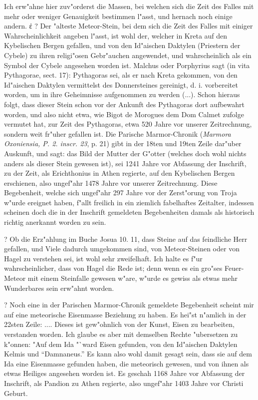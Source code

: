 \documentclass[a4paper, 11pt, oneside, polutonikogreek, german]{article}
\begin{document}
Ich erw"ahne hier zuv"orderst die Massen, bei welchen sich die Zeit des Falles mit mehr oder weniger Genauigkeit bestimmen l"asst, und hernach noch einige andern.
ἐ
? Der "alteste Meteor-Stein, bei dem sich die Zeit des Falles mit einiger Wahrscheinlichkeit angeben l"asst, ist wohl der, welcher in Kreta auf den Kybelischen Bergen gefallen, und von den Id"aischen Daktylen (Priestern der Cybele) zu ihren religi"osen Gebr"auchen angewendet, und wahrscheinlich als ein Symbol der Cybele angesehen worden ist. Malchus oder Porphyrius sagt (in vita Pythagorae, sect. 17): Pythagoras sei, als er nach Kreta gekommen, von den Id"aischen Daktylen vermittelst des Donnersteines gereinigt, d. i. vorbereitet worden, um in ihre Geheimnisse aufgenommen zu werden (...). Schon hieraus folgt, dass dieser Stein schon vor der Ankunft des Pythagoras dort aufbewahrt worden, und also nicht etwa, wie Bigot de Morogues dem Dom Calmet zufolge vermutet hat, zur Zeit des Pythagoras, etwa 520 Jahre vor unserer Zeitrechnung, sondern weit fr"uher gefallen ist. Die Parische Marmor-Chronik (\emph{Marmora Oxoniensia, P. 2. inscr. 23}, p. 21) gibt in der 18ten und 19ten Zeile dar"uber Auskunft, und sagt: das Bild der Mutter der G"otter (welches doch wohl nichts anders als dieser Stein gewesen ist), sei 1241 Jahre vor Abfassung der Inschrift, zu der Zeit, als Erichthonius in Athen regierte, auf den Kybelischen Bergen erschienen, also ungef"ahr 1478 Jahre vor unserer Zeitrechnung. Diese Begebenheit, welche sich ungef"ahr 297 Jahre vor der Zerst"orung von Troja w"urde ereignet haben, f"allt freilich in ein ziemlich fabelhaftes Zeitalter, indessen scheinen doch die in der Inschrift gemeldeten Begebenheiten damals als historisch richtig anerkannt worden zu sein.

? Ob die Erz"ahlung im Buche Josua 10. 11, dass Steine auf das feindliche Herr gefallen, und Viele dadurch umgekommen sind, von Meteor-Steinen oder von Hagel zu verstehen sei, ist wohl sehr zweifelhaft. Ich halte es f"ur wahrscheinlicher, dass von Hagel die Rede ist; denn wenn es ein gro"ses Feuer-Meteor mit einem Steinfalle gewesen w"are, w"urde es gewiss als etwas mehr Wunderbares sein erw"ahnt worden.

? Noch eine in der Parischen Marmor-Chronik gemeldete Begebenheit scheint mir auf eine meteorische Eisenmasse Beziehung zu haben. Es hei"st n"amlich in der 22sten Zeile: .... Dieses ist gew"ohnlich von der Kunst, Eisen zu bearbeiten, verstanden worden. Ich glaube es aber mit demselben Rechte "ubersetzen zu k"onnen: "Auf dem Ida "`ward Eisen gefunden, von den Id"aischen Daktylen Kelmis und "`Damnaneus."' Es kann also wohl damit gesagt sein, dass sie auf dem Ida eine Eisenmasse gefunden haben, die meteorisch gewesen, und von ihnen als etwas Heiliges angesehen worden ist. Es geschah 1168 Jahre vor Abfassung der Inschrift, als Pandion zu Athen regierte, also ungef"ahr 1403 Jahre vor Christi Geburt.
\end{document}
